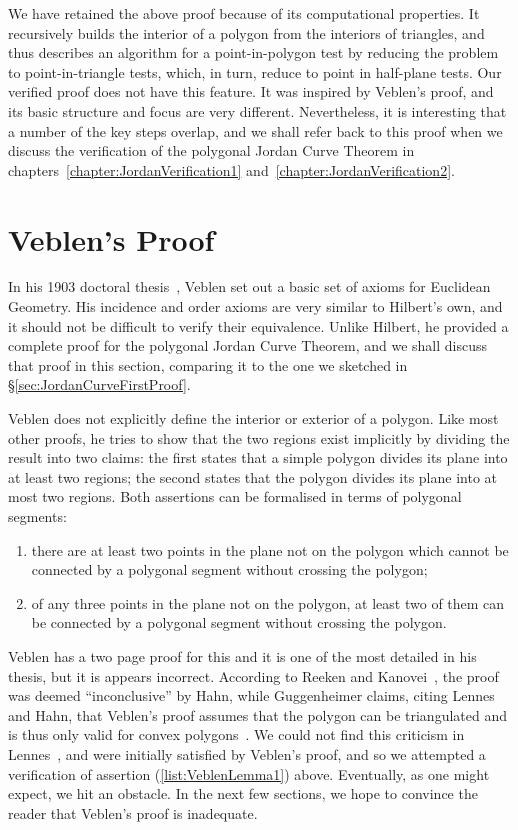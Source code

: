 We have retained the above proof because of its computational properties. It recursively builds the interior of a polygon from the interiors of triangles, and thus describes an algorithm for a point-in-polygon test by reducing the problem to point-in-triangle tests, which, in turn, reduce to point in half-plane tests. Our verified proof does not have this feature. It was inspired by Veblen's proof, and its basic structure and focus are very different. Nevertheless, it is interesting that a number of the key steps overlap, and we shall refer back to this proof when we discuss the verification of the polygonal Jordan Curve Theorem in chapters~\ref{chapter:JordanVerification1} and~\ref{chapter:JordanVerification2}.

\section{Veblen's Proof}\label{sec:VeblenProof}
In his 1903 doctoral thesis~\cite{Veblenphd}, Veblen set out a basic set of axioms for Euclidean Geometry. His incidence and order axioms are very similar to Hilbert's own, and it should not be difficult to verify their equivalence. Unlike Hilbert, he provided a complete proof for the polygonal Jordan Curve Theorem, and we shall discuss that proof in this section, comparing it to the one we sketched in \S\ref{sec:JordanCurveFirstProof}.

Veblen does not explicitly define the interior or exterior of a polygon. Like most other proofs, he tries to show that the two regions exist implicitly by dividing the result into two claims: the first states that a simple polygon divides its plane into at least two regions; the second states that the polygon divides its plane into at most two regions. Both assertions can be formalised in terms of polygonal segments:
\begin{enumerate}
\item there are at least two points in the plane not on the polygon which cannot be connected by a polygonal segment without crossing the polygon\label{list:VeblenLemma1};
\item of any three points in the plane not on the polygon, at least two of them can be connected by a polygonal segment without crossing the polygon.
\end{enumerate}

Veblen has a two page proof for this and it is one of the most detailed in his thesis, but it is appears incorrect. According to Reeken and Kanovei~\cite{HahnInconclusiveIndirect}, the proof was deemed ``inconclusive'' by Hahn, while Guggenheimer claims, citing Lennes and Hahn, that Veblen's proof assumes that the polygon can be triangulated and is thus only valid for convex polygons~\cite{GuggenheimerJordanCurve}. We could not find this criticism in Lennes~\cite{LennesPolygon}, and were initially satisfied by Veblen's proof, and so we attempted a verification of assertion (\ref{list:VeblenLemma1}) above. Eventually, as one might expect, we hit an obstacle. In the next few sections, we hope to convince the reader that Veblen's proof is inadequate.

